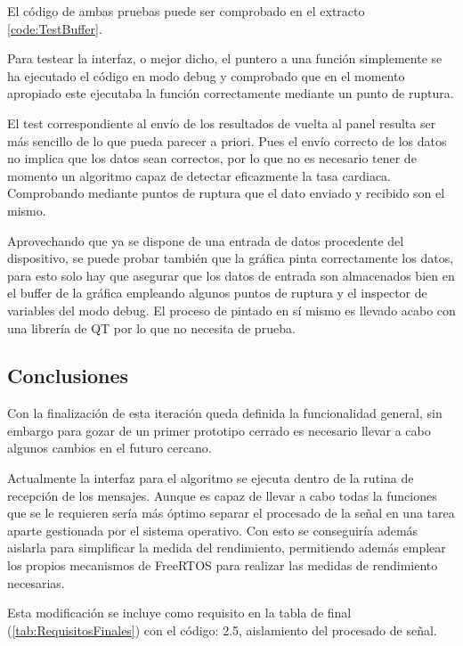          El código de ambas pruebas puede ser comprobado en el extracto \ref{code:TestBuffer}.

        Para testear la interfaz, o mejor dicho, el puntero a una función simplemente se ha ejecutado el código en modo debug y comprobado que en el momento apropiado este ejecutaba la función correctamente mediante un punto de ruptura. 

        El test correspondiente al envío de los resultados de vuelta al panel resulta ser más sencillo de lo que pueda parecer a priori. Pues el envío correcto de los datos no implica que los datos sean correctos, por lo que no es necesario tener de momento un algoritmo capaz de detectar eficazmente la tasa cardiaca. Comprobando mediante puntos de ruptura que el dato enviado y recibido son el mismo. 
        
        Aprovechando que ya se dispone de una entrada de datos procedente del dispositivo, se puede probar también que la gráfica pinta correctamente los datos, para esto solo hay que asegurar que los datos de entrada son almacenados bien en el buffer de la gráfica empleando algunos puntos de ruptura y el inspector de variables del modo debug. El proceso de pintado en sí mismo es llevado acabo con una librería de QT por lo que no necesita de prueba.
        

        
    \subsection{Conclusiones}
    
        Con la finalización de esta iteración queda definida la funcionalidad general, sin embargo para gozar de un primer prototipo cerrado es necesario llevar a cabo algunos cambios en el futuro cercano.
        
        Actualmente la interfaz para el algoritmo se ejecuta dentro de la rutina de recepción de los mensajes. Aunque es capaz de llevar a cabo todas la funciones que se le requieren sería más óptimo separar el procesado de la señal en una tarea aparte gestionada por el sistema operativo. Con esto se conseguiría además aislarla para simplificar la medida del rendimiento, permitiendo además emplear los propios mecanismos de FreeRTOS \cite{FreeRTOS} para realizar las medidas de rendimiento necesarias.
        
        Esta modificación se incluye como requisito en la tabla de final (\ref{tab:RequisitosFinales}) con el código: 2.5, aislamiento del procesado de señal.